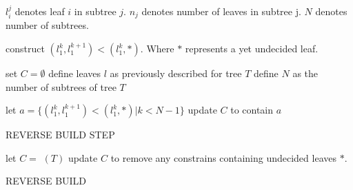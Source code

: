 $l^j_i$ denotes leaf $i$ in subtree $j$.
$n_j$ denotes number of leaves in subtree j.
$N$ denotes number of subtrees.

construct $(l_1^k, l_1^{k+1}) < (l_1^k, *)$. Where $*$ represents a yet undecided leaf.


\begin{algorithm}[H]
    \SetAlgoLined
     set $C=\emptyset$\;
     define leaves $l$ as previously described for tree $T$\;
     define $N$ as the number of subtrees of tree $T$\;
     
     let $a = \{(l_1^k, l_1^{k+1}) < (l_1^k, *)|k<N-1\}$\;
     update $C$ to contain $a$\;
    
     \caption{REVERSE BUILD STEP}
\end{algorithm}

\begin{algorithm}[H]
    \SetAlgoLined
     
    let $C=$ $(T)$\;
    update $C$ to remove any constrains containing undecided leaves $*$.
     
     \caption{REVERSE BUILD}
\end{algorithm}
        